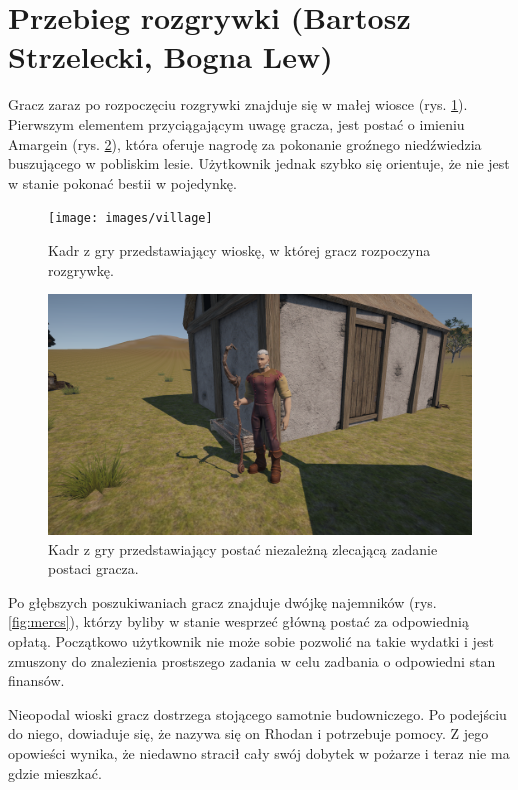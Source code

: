 \section{Przebieg rozgrywki (Bartosz Strzelecki, Bogna Lew)}
Gracz zaraz po rozpoczęciu rozgrywki znajduje się w małej wiosce (rys. \ref{fig:village}). Pierwszym
elementem przyciągającym uwagę gracza, jest postać o imieniu Amargein (rys. \ref{fig:npc}), która oferuje
nagrodę za pokonanie groźnego niedźwiedzia buszującego w pobliskim lesie. Użytkownik jednak
szybko się orientuje, że nie jest w stanie pokonać bestii w pojedynkę.

\begin{figure}[h]
\centering
\texttt{[image: images/village]}
\caption{Kadr z gry przedstawiający wioskę, w której gracz rozpoczyna rozgrywkę.}
\label{fig:village}
\end{figure}

\begin{figure}[h]
\centering
\includegraphics[width=1\textwidth]{images/npc1}
\caption{Kadr z gry przedstawiający postać niezależną zlecającą zadanie postaci gracza.}
\label{fig:npc}
\end{figure}

Po głębszych poszukiwaniach gracz znajduje dwójkę najemników (rys. \ref{fig:mercs}), którzy byliby w stanie
wesprzeć główną postać za odpowiednią opłatą. Początkowo użytkownik nie może sobie
pozwolić na takie wydatki i jest zmuszony do znalezienia prostszego zadania
w celu zadbania o odpowiedni stan finansów.

Nieopodal wioski gracz dostrzega stojącego samotnie budowniczego. Po podejściu do niego, dowiaduje się, że nazywa się on
Rhodan i potrzebuje pomocy. Z jego opowieści wynika, że niedawno stracił cały swój dobytek w
pożarze i teraz nie ma gdzie mieszkać.

